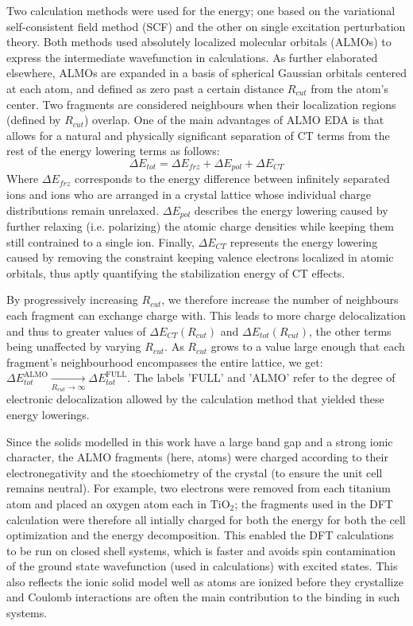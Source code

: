 \documentclass[aps,prb,twocolumn,amsmath,amssymb,superscriptaddress,longbibliography]{revtex4-1}
\begin{document}
Two calculation methods were used for the energy; one based on the variational self-consistent field method (SCF) and the other on single excitation perturbation theory\cite{xpt}. 
Both methods used absolutely localized molecular orbitals (ALMOs) to express the intermediate wavefunction in calculations. 
As further elaborated elsewhere, ALMOs are expanded in a basis of spherical Gaussian orbitals centered at each atom, and defined as zero past a certain distance $R_{cut}$ from the atom's center. 
Two fragments are considered neighbours when their localization regions (defined by $R_{cut}$) overlap.
One of the main advantages of ALMO EDA is that allows for a natural and physically significant separation of CT terms from the rest of the energy lowering terms as follows:
\begin{equation}
\Delta E_{tot} = \Delta E_{frz} + \Delta E_{pol} + \Delta E_{CT}
\end{equation}
Where $\Delta E_{frz}$ corresponds to the energy difference between infinitely separated ions and ions who are arranged in a crystal lattice whose individual charge distributions remain unrelaxed. 
$\Delta E_{pol}$ describes the energy lowering caused by further relaxing (i.e. polarizing) the atomic charge densities  while keeping them still contrained to a single ion.
Finally, $\Delta E_{CT}$ represents the energy lowering caused by removing the constraint keeping valence electrons localized in atomic orbitals, thus aptly quantifying the stabilization energy of CT effects.


By progressively increasing $R_{cut}$, we therefore increase the number of neighbours each fragment can exchange charge with. 
This leads to more charge delocalization and thus to greater values of $\Delta E_{CT}\left(R_{cut}\right)$ and $\Delta E_{tot}\left(R_{cut}\right)$, the other terms being unaffected by varying $R_{cut}$. 
As $R_{cut}$ grows to a value large enough that each fragment's neighbourhood encompasses the entire lattice, we get: ${\Delta E_{tot}^{\text{ALMO}} \xrightarrow[R_{cut}\to\infty] \, \Delta E_{tot}^{\text{FULL}}}$. 
The labels 'FULL' and 'ALMO' refer to the degree of electronic delocalization allowed by the calculation method that yielded these energy lowerings.

Since the solids modelled in this work have a large band gap and a strong ionic character, the ALMO fragments (here, atoms) were charged according to their electronegativity and the stoechiometry of the crystal (to ensure the unit cell remains neutral). 
For example, two electrons were removed from each titanium atom and placed an oxygen atom each in $\text{TiO}_{2}$; the fragments used in the DFT calculation were therefore all intially charged for both the energy for both the cell optimization and the energy decomposition. 
This enabled the DFT calculations to be run on closed shell systems, which is faster and avoids spin contamination of the ground state wavefunction (used in calculations) with excited states.
This also reflects the ionic solid model well as atoms are ionized before they crystallize and Coulomb interactions are often the main contribution to the binding in such systems.\\
\end{document}
